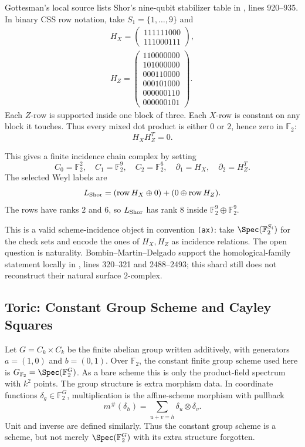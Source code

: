 Gottesman's local source lists Shor's nine-qubit stabilizer table in
, lines
920--935.  In binary CSS row notation, take \(S_1=\{1,\ldots,9\}\) and
\[
\begin{gathered}
H_X=\begin{pmatrix}111111000\\111000111\end{pmatrix},\\
H_Z=\begin{pmatrix}
110000000\\101000000\\000110000\\000101000\\000000110\\000000101
\end{pmatrix}.
\end{gathered}
\]
Each \(Z\)-row is supported inside one block of three.  Each \(X\)-row is
constant on any block it touches.  Thus every mixed dot product is either \(0\)
or \(2\), hence zero in \(\mathbb F_2\):
\[
  H_XH_Z^T=0.
\]

This gives a finite incidence chain complex by setting
\[
  C_0=\mathbb F_2^2,\quad C_1=\mathbb F_2^9,\quad C_2=\mathbb F_2^6,
  \quad \partial_1=H_X,\quad \partial_2=H_Z^T .
\]
The selected Weyl labels are
\[
  L_{\rm Shor}
  =
  (\operatorname{row}H_X\oplus0)+(0\oplus\operatorname{row}H_Z).
\]
The rows have ranks \(2\) and \(6\), so \(L_{\rm Shor}\) has rank \(8\) inside
\(\mathbb F_2^9\oplus\mathbb F_2^9\).

This is a valid scheme-incidence object in convention \texttt{(ax)}: take
\(\Spec(\mathbb F_2^{S_i})\) for the check sets and encode the ones of
\(H_X,H_Z\) as incidence relations.  The open question is naturality.
Bombin--Martin--Delgado support the homological-family statement locally in , lines 320--321 and 2488--2493; this shard still does not reconstruct their natural surface \(2\)-complex.

\subsection{Toric: Constant Group Scheme and Cayley Squares}

Let \(G=C_k\times C_k\) be the finite abelian group written additively, with
generators \(a=(1,0)\) and \(b=(0,1)\).  Over \(\mathbb F_2\), the constant
finite group scheme used here is \(G_{\mathbb F_2}=\Spec(\mathbb F_2^G)\).  As
a bare scheme this is only the product-field spectrum with \(k^2\) points.  The
group structure is extra morphism data.  In coordinate functions
\(\delta_g\in\mathbb F_2^G\), multiplication is the affine-scheme morphism with
pullback
\[
  m^\#(\delta_h)=\sum_{u+v=h}\delta_u\otimes\delta_v .
\]
Unit and inverse are defined similarly.  Thus the constant group scheme is a
scheme, but not merely \(\Spec(\mathbb F_2^G)\) with its extra structure
forgotten.


